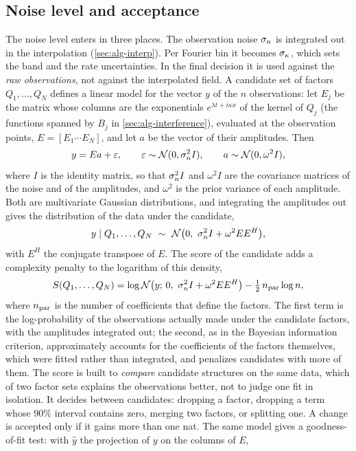 \subsection{Noise level and acceptance}\label{sec:alg-accept}
The noise level enters in three places. The observation noise $\sigma_{n}$ is integrated out in the
interpolation (\cref{sec:alg-interp}). Per Fourier bin it becomes $\sigma_{\kappa}$, which sets the band and the
rate uncertainties. In the final decision it is used against the \emph{raw observations}, not against the
interpolated field. A candidate set of factors $Q_1,\dots,Q_N$ defines a linear model for the vector $y$ of the $n$
observations: let $E_j$ be the matrix whose columns are the exponentials $e^{\lambda t+i\kappa x}$ of the kernel of $Q_j$
(the functions spanned by $B_j$ in \cref{sec:alg-interference}), evaluated at the observation points, $E=[E_1\cdots E_N]$,
and let $a$ be the vector of their amplitudes. Then
\[
  y=Ea+\varepsilon,\qquad \varepsilon\sim\mathcal{N}(0,\sigma_{n}^2I),\qquad a\sim\mathcal{N}(0,\omega^2I),
\]
where $I$ is the identity matrix, so that $\sigma_{n}^2I$ and $\omega^2I$ are the covariance matrices of the noise and of the
amplitudes, and $\omega^2$ is the prior variance of each amplitude. Both are multivariate Gaussian distributions, and
integrating the amplitudes out gives the distribution of the data under the candidate,
\[
  y\mid Q_1,\dots,Q_N\ \sim\ \Normal\big(0,\ \noise^2I+\omega^2EE^H\big),
\]
with $E^H$ the conjugate transpose of $E$. The score of the candidate adds a complexity penalty to the logarithm of
this density,
\begin{equation}\label{eq:raw-evidence}
  S(Q_1,\dots,Q_N)=\log\Normal\big(y;\,0,\ \noise^2I+\omega^2EE^H\big)-\tfrac12\,n_{\rm par}\log n ,
\end{equation}
where $n_{\rm par}$ is the number of coefficients that define the factors. The first term is the log-probability of
the observations actually made under the candidate factors, with the amplitudes integrated out; the second, as in the
Bayesian information criterion, approximately accounts for the coefficients of the factors themselves, which were fitted
rather than integrated, and penalizes candidates with more of them.
The score is built to \emph{compare} candidate structures on the same data, which of two factor sets explains the
observations better, not to judge one fit in isolation. It decides between candidates: dropping a factor, dropping a term whose $90\%$
interval contains zero, merging two factors, or splitting one. A change is accepted only if it gains more
than one nat. The same model gives a goodness-of-fit test: with $\hat y$ the projection of $y$ on the columns of $E$,
